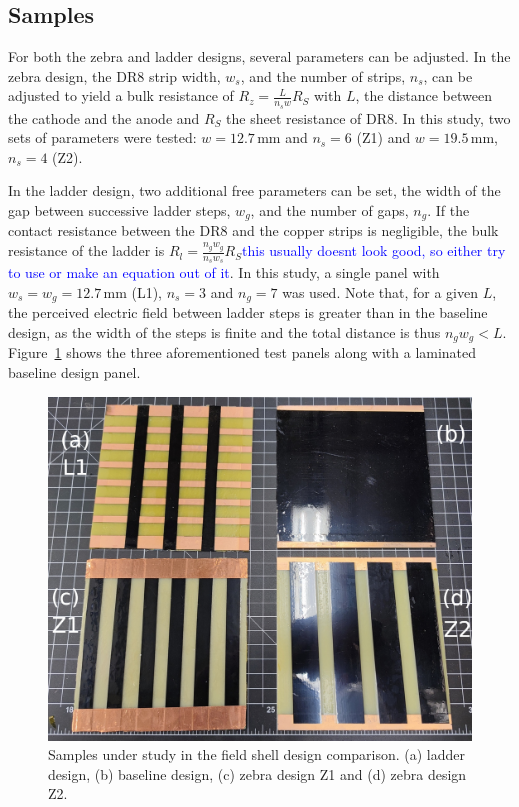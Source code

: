 \documentclass[a4paper,12pt]{article}
\newcommand{\DR}{DR8}
\newcommand{\RI}[1]{\textcolor{blue}{#1}}
\begin{document}
\subsection{Samples}
\label{sec:alt_samples}
For both the zebra and ladder designs, several parameters can be adjusted. In the zebra design, the {\DR} strip width, $w_s$, and the number of strips, $n_s$, can be adjusted to yield a bulk resistance of $R_z=\frac{L}{n_sw}R_S$ with $L$, the distance between the cathode and the anode and $R_S$ the sheet resistance of {\DR}. In this study, two sets of parameters were tested: $w=12.7\,$mm and $n_s=6$ (Z1) and $w=19.5$\,mm, $n_s=4$ (Z2).

In the ladder design, two additional free parameters can be set, the width of the gap between successive ladder steps, $w_g$, and the number of gaps, $n_g$. If the contact resistance between the {\DR} and the copper strips is negligible, the bulk resistance of the ladder is $R_l=\frac{n_gw_g}{n_sw_s}R_S$\RI{this usually doesnt look good, so either try to use \sfrac{1}{2} or make an equation out of it}. In this study, a single panel with $w_s=w_g=12.7\,$mm (L1), $n_s=3$ and $n_g=7$ was used. Note that, for a given $L$, the perceived electric field between ladder steps is greater than in the baseline design, as the width of the steps is finite and the total distance is thus $n_gw_g<L$. Figure~\ref{fig:shell_designs_picture} shows the three aforementioned test panels along with a laminated baseline design panel.

\begin{figure}[htbp]
\centering
\includegraphics[width=.75\linewidth]{field_shell_designs.jpg}
\caption{Samples under study in the field shell design comparison. (a) ladder design, (b) baseline design, (c) zebra design Z1 and (d) zebra design Z2.}
\label{fig:shell_designs_picture}
\end{figure}
\end{document}
